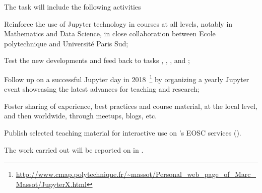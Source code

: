 \begin{task}[
  title=Demonstrator: enriched teaching with Jupyter,
  id=teaching,
  lead=EP,
  PM=5, %
  wphases={1-48},
  partners={EGI,UIO,UPSUD,XFEL}
  ]

  The task will include the following activities
  \begin{compactitem}
  \item Reinforce the use of Jupyter technology in courses at
    all levels, notably in Mathematics and Data Science, in close
    collaboration between Ecole polytechnique and Université Paris Sud;
  \item Test the new developments and feed back to tasks
    , , ,  and ;
  \item Follow up on a successful Jupyter day in
    2018~\footnote{\url{http://www.cmap.polytechnique.fr/~massot/Personal_web_page_of_Marc_Massot/JupyterX.html}}
    by organizing a yearly Jupyter event showcasing the latest
    advances for teaching and research;
  \item Foster sharing of experience, best practices and course
    material, at the local level, and then worldwide, through meetups,
    blogs, etc.
  \item Publish selected teaching material for interactive use on
    \TheProject's EOSC services ().
  \end{compactitem}
  The work carried out will be reported on in
  .
\end{task}
